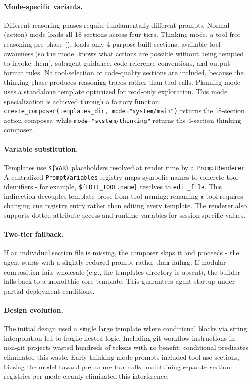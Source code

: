 \paragraph{Mode-specific variants.} Different reasoning phases require fundamentally different prompts. Normal (action) mode loads all 18 sections across four tiers. Thinking mode, a tool-free reasoning pre-phase (), loads only 4 purpose-built sections: available-tool awareness (so the model knows what actions are possible without being tempted to invoke them), subagent guidance, code-reference conventions, and output-format rules. No tool-selection or code-quality sections are included, because the thinking phase produces reasoning traces rather than tool calls. Planning mode uses a standalone template optimized for read-only exploration. This mode specialization is achieved through a factory function: \texttt{create\_composer(templates\_dir, mode="system/main")} returns the 18-section action composer, while \texttt{mode="system/thinking"} returns the 4-section thinking composer.

\paragraph{Variable substitution.} Templates use \texttt{\$\{VAR\}} placeholders resolved at render time by a \texttt{PromptRenderer}. A centralized \texttt{PromptVariables} registry maps symbolic names to concrete tool identifiers - for example, \texttt{\$\{EDIT\_TOOL.name\}} resolves to \texttt{edit\_file}. This indirection decouples template prose from tool naming: renaming a tool requires changing one registry entry rather than editing every template. The renderer also supports dotted attribute access and runtime variables for session-specific values.

\paragraph{Two-tier fallback.} If an individual section file is missing, the composer skips it and proceeds - the agent starts with a slightly reduced prompt rather than failing. If modular composition fails wholesale (e.g., the templates directory is absent), the builder falls back to a monolithic core template. This guarantees agent startup under partial-deployment conditions.

\paragraph{Design evolution.} The initial design used a single large template where conditional blocks via string interpolation led to fragile nested logic. Including git-workflow instructions in non-git projects wasted hundreds of tokens with no benefit; conditional predicates eliminated this waste. Early thinking-mode prompts included tool-use sections, biasing the model toward premature tool calls; maintaining separate section registries per mode cleanly eliminated this interference.
